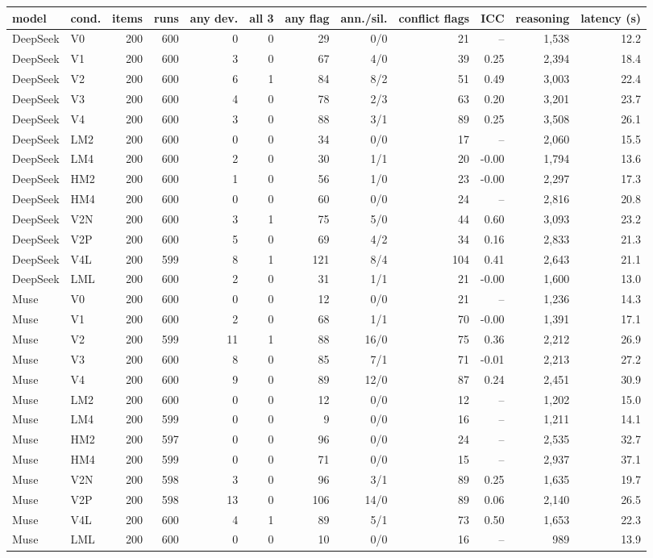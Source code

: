 \begin{tabular}{llrrrrrrrrrr}
\toprule
model & cond. & items & runs & any dev. & all 3 & any flag & ann./sil. & conflict flags & ICC & reasoning & latency (s) \\
\midrule
DeepSeek & V0 & 200 & 600 & 0 & 0 & 29 & 0/0 & 21 & -- & 1,538 & 12.2 \\
DeepSeek & V1 & 200 & 600 & 3 & 0 & 67 & 4/0 & 39 & 0.25 & 2,394 & 18.4 \\
DeepSeek & V2 & 200 & 600 & 6 & 1 & 84 & 8/2 & 51 & 0.49 & 3,003 & 22.4 \\
DeepSeek & V3 & 200 & 600 & 4 & 0 & 78 & 2/3 & 63 & 0.20 & 3,201 & 23.7 \\
DeepSeek & V4 & 200 & 600 & 3 & 0 & 88 & 3/1 & 89 & 0.25 & 3,508 & 26.1 \\
DeepSeek & LM2 & 200 & 600 & 0 & 0 & 34 & 0/0 & 17 & -- & 2,060 & 15.5 \\
DeepSeek & LM4 & 200 & 600 & 2 & 0 & 30 & 1/1 & 20 & -0.00 & 1,794 & 13.6 \\
DeepSeek & HM2 & 200 & 600 & 1 & 0 & 56 & 1/0 & 23 & -0.00 & 2,297 & 17.3 \\
DeepSeek & HM4 & 200 & 600 & 0 & 0 & 60 & 0/0 & 24 & -- & 2,816 & 20.8 \\
DeepSeek & V2N & 200 & 600 & 3 & 1 & 75 & 5/0 & 44 & 0.60 & 3,093 & 23.2 \\
DeepSeek & V2P & 200 & 600 & 5 & 0 & 69 & 4/2 & 34 & 0.16 & 2,833 & 21.3 \\
DeepSeek & V4L & 200 & 599 & 8 & 1 & 121 & 8/4 & 104 & 0.41 & 2,643 & 21.1 \\
DeepSeek & LML & 200 & 600 & 2 & 0 & 31 & 1/1 & 21 & -0.00 & 1,600 & 13.0 \\
Muse & V0 & 200 & 600 & 0 & 0 & 12 & 0/0 & 21 & -- & 1,236 & 14.3 \\
Muse & V1 & 200 & 600 & 2 & 0 & 68 & 1/1 & 70 & -0.00 & 1,391 & 17.1 \\
Muse & V2 & 200 & 599 & 11 & 1 & 88 & 16/0 & 75 & 0.36 & 2,212 & 26.9 \\
Muse & V3 & 200 & 600 & 8 & 0 & 85 & 7/1 & 71 & -0.01 & 2,213 & 27.2 \\
Muse & V4 & 200 & 600 & 9 & 0 & 89 & 12/0 & 87 & 0.24 & 2,451 & 30.9 \\
Muse & LM2 & 200 & 600 & 0 & 0 & 12 & 0/0 & 12 & -- & 1,202 & 15.0 \\
Muse & LM4 & 200 & 599 & 0 & 0 & 9 & 0/0 & 16 & -- & 1,211 & 14.1 \\
Muse & HM2 & 200 & 597 & 0 & 0 & 96 & 0/0 & 24 & -- & 2,535 & 32.7 \\
Muse & HM4 & 200 & 599 & 0 & 0 & 71 & 0/0 & 15 & -- & 2,937 & 37.1 \\
Muse & V2N & 200 & 598 & 3 & 0 & 96 & 3/1 & 89 & 0.25 & 1,635 & 19.7 \\
Muse & V2P & 200 & 598 & 13 & 0 & 106 & 14/0 & 89 & 0.06 & 2,140 & 26.5 \\
Muse & V4L & 200 & 600 & 4 & 1 & 89 & 5/1 & 73 & 0.50 & 1,653 & 22.3 \\
Muse & LML & 200 & 600 & 0 & 0 & 10 & 0/0 & 16 & -- & 989 & 13.9 \\
\bottomrule
\end{tabular}
